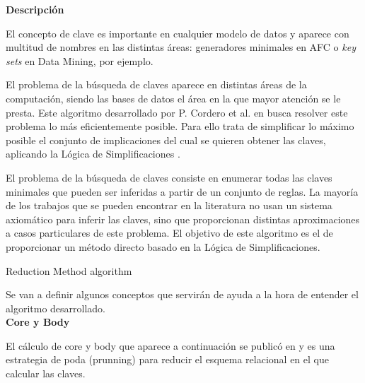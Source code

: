 \textbf{Descripci\'on} 

El concepto de clave es importante en cualquier modelo de datos y aparece con multitud de nombres en las distintas \'areas: generadores minimales en AFC o \textit{key sets} en Data Mining, por ejemplo.

El problema de la b\'usqueda de claves aparece en distintas \'areas de la computaci\'on, siendo las bases de datos el \'area en la que mayor atenci\'on se le presta. Este algoritmo desarrollado por P. Cordero et al. en  \cite{Reduction} busca resolver este problema lo m\'as eficientemente posible. Para ello trata de simplificar lo m\'aximo posible el conjunto de implicaciones del cual se quieren obtener las claves, aplicando la L\'ogica de Simplificaciones \cite{Cordero2002}.

El problema de la b\'usqueda de claves consiste en enumerar todas las claves minimales que pueden ser inferidas a partir de un conjunto de reglas. La mayor\'ia de los trabajos que se pueden encontrar en la literatura no usan un sistema axiom\'atico para inferir las claves, sino que proporcionan distintas aproximaciones a casos particulares de este problema. El objetivo de este algoritmo es el de proporcionar un m\'etodo directo basado en la L\'ogica de Simplificaciones.\\

\IncMargin{1em}
\begin{algorithm}[H]
    \SetAlgoLined
    \DontPrintSemicolon
    \caption{Reduction Method algorithm}\label{alg:3}
\end{algorithm}\DecMargin{1em}
\newpage
Se van a definir algunos conceptos que servir\'an de ayuda a la hora de entender el algoritmo desarrollado.\\

\textbf{Core y Body}

El c\'alculo de core y body que aparece a continuaci\'on se public\'o en \cite{Reduction} y es una estrategia de poda (prunning) para reducir el esquema relacional en el que calcular las claves. 

